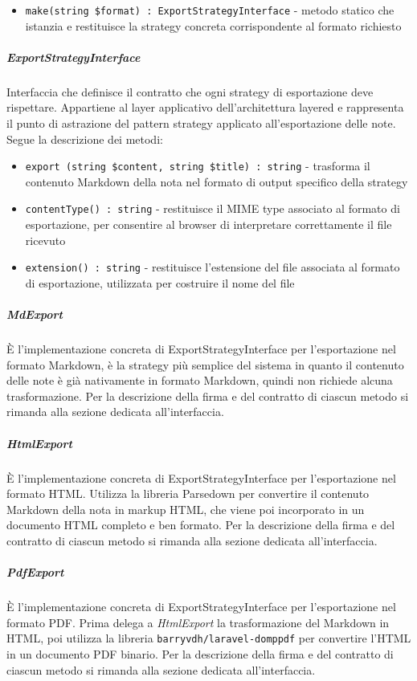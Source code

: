 \documentclass[a4paper,10pt]{article}
\begin{document}
\begin{itemize}
    \item \texttt{make(string \$format) : ExportStrategyInterface} - metodo statico che istanzia e restituisce la strategy concreta corrispondente al formato richiesto
\end{itemize}
\subparagraph{ExportStrategyInterface} Interfaccia che definisce il contratto che ogni strategy di esportazione deve rispettare. Appartiene al layer applicativo dell'architettura layered e rappresenta il punto di astrazione del pattern strategy applicato all'esportazione delle note. Segue la descrizione dei metodi:
\begin{itemize}
    \item \texttt{export (string \$content, string \$title) : string} - trasforma il contenuto Markdown della nota nel formato di output specifico della strategy
    \item \texttt{contentType() : string} - restituisce il MIME type associato al formato di esportazione, per consentire al browser di interpretare correttamente il file ricevuto
    \item \texttt{extension() : string} - restituisce l'estensione del file associata al formato di esportazione, utilizzata per costruire il nome del file
\end{itemize}
\subparagraph{MdExport} È l'implementazione concreta di ExportStrategyInterface per l'esportazione nel formato Markdown, è la strategy più semplice del sistema in quanto il contenuto delle note è già nativamente in formato Markdown, quindi non richiede alcuna trasformazione. Per la descrizione della firma e del contratto di ciascun metodo si rimanda alla sezione dedicata all'interfaccia.
\subparagraph{HtmlExport} È l'implementazione concreta di ExportStrategyInterface per l'esportazione nel formato HTML. Utilizza la libreria Parsedown per convertire il contenuto Markdown della nota in markup HTML, che viene poi incorporato in un documento HTML completo e ben formato. Per la descrizione della firma e del contratto di ciascun metodo si rimanda alla sezione dedicata all'interfaccia.
\subparagraph{PdfExport} È l'implementazione concreta di ExportStrategyInterface per l'esportazione nel formato PDF. Prima delega a \textit{HtmlExport} la trasformazione del Markdown in HTML, poi utilizza la libreria \texttt{barryvdh/laravel-domppdf} per convertire l'HTML in un documento PDF binario. Per la descrizione della firma e del contratto di ciascun metodo si rimanda alla sezione dedicata all'interfaccia.
\end{document}
